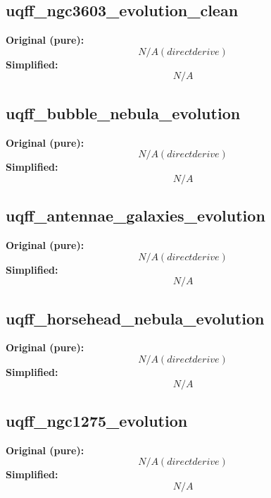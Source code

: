 \subsection{uqff_ngc3603_evolution_clean}
\textbf{Original (pure):}
\begin{equation}
N/A (direct derive)
\end{equation}
\textbf{Simplified:}
\begin{equation}
N/A
\end{equation}

\subsection{uqff_bubble_nebula_evolution}
\textbf{Original (pure):}
\begin{equation}
N/A (direct derive)
\end{equation}
\textbf{Simplified:}
\begin{equation}
N/A
\end{equation}

\subsection{uqff_antennae_galaxies_evolution}
\textbf{Original (pure):}
\begin{equation}
N/A (direct derive)
\end{equation}
\textbf{Simplified:}
\begin{equation}
N/A
\end{equation}

\subsection{uqff_horsehead_nebula_evolution}
\textbf{Original (pure):}
\begin{equation}
N/A (direct derive)
\end{equation}
\textbf{Simplified:}
\begin{equation}
N/A
\end{equation}

\subsection{uqff_ngc1275_evolution}
\textbf{Original (pure):}
\begin{equation}
N/A (direct derive)
\end{equation}
\textbf{Simplified:}
\begin{equation}
N/A
\end{equation}

